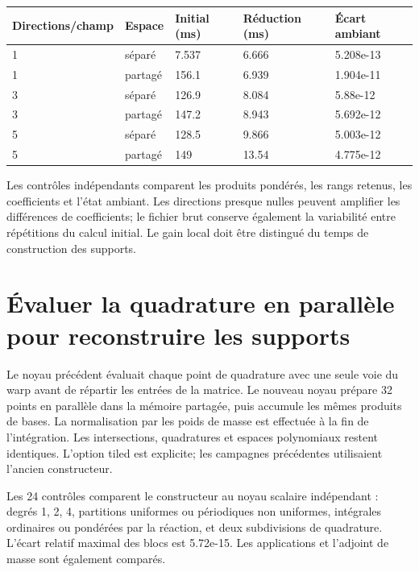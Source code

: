 \documentclass[10pt,a4paper]{article}
\begin{document}
\begin{center}\small\begin{tabular}{lllll}\toprule
Directions/champ & Espace & Initial (ms) & Réduction (ms) & Écart ambiant\\\midrule
1 & séparé & 7.537 & 6.666 & 5.208e-13\\
1 & partagé & 156.1 & 6.939 & 1.904e-11\\
3 & séparé & 126.9 & 8.084 & 5.88e-12\\
3 & partagé & 147.2 & 8.943 & 5.692e-12\\
5 & séparé & 128.5 & 9.866 & 5.003e-12\\
5 & partagé & 149 & 13.54 & 4.775e-12\\
\bottomrule\end{tabular}\end{center}
Les contrôles indépendants comparent les produits pondérés, les rangs retenus, les coefficients et l'état ambiant. Les directions presque nulles peuvent amplifier les différences de coefficients; le fichier brut conserve également la variabilité entre répétitions du calcul initial. Le gain local doit être distingué du temps de construction des supports.

\section{Évaluer la quadrature en parallèle pour reconstruire les supports}
Le noyau précédent évaluait chaque point de quadrature avec une seule voie du warp avant de répartir les entrées de la matrice. Le nouveau noyau prépare 32 points en parallèle dans la mémoire partagée, puis accumule les mêmes produits de bases. La normalisation par les poids de masse est effectuée à la fin de l'intégration. Les intersections, quadratures et espaces polynomiaux restent identiques. L'option tiled est explicite; les campagnes précédentes utilisaient l'ancien constructeur.

Les 24 contrôles comparent le constructeur au noyau scalaire indépendant : degrés 1, 2, 4, partitions uniformes ou périodiques non uniformes, intégrales ordinaires ou pondérées par la réaction, et deux subdivisions de quadrature. L'écart relatif maximal des blocs est 5.72e-15. Les applications et l'adjoint de masse sont également comparés.
\end{document}
